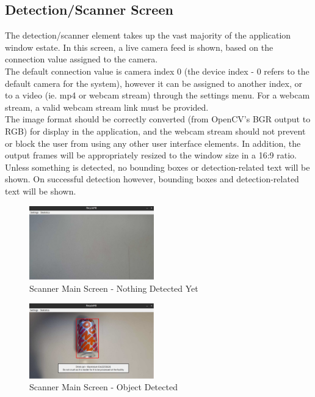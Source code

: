 \documentclass[conference]{IEEEtran}
\begin{document}
\newpage
\subsection{Detection/Scanner Screen}
The detection/scanner element takes up the vast majority of the application window estate. In this screen, a live camera feed is shown, based on the connection value assigned to the camera.~\\

The default connection value is camera index 0 (the device index - 0 refers to the default camera for the system), however it can be assigned to another index, or to a video (ie. mp4 or webcam stream) through the settings menu. For a webcam stream, a valid webcam stream link must be provided.~\\

The image format should be correctly converted (from OpenCV's BGR output to RGB) for display in the application, and the webcam stream should not prevent or block the user from using any other user interface elements. In addition, the output frames will be appropriately resized to the window size in a 16:9 ratio.~\\

Unless something is detected, no bounding boxes or detection-related text will be shown. On successful detection however, bounding boxes and detection-related text will be shown.

\begin{figure}[!h]
    \centering
    \includegraphics[width=0.48\textwidth]{images/nothing_detected.eps}
    \caption{Scanner Main Screen - Nothing Detected Yet}
\end{figure}

\begin{figure}[!h]
    \centering
    \includegraphics[width=0.48\textwidth]{images/successful_detection.eps}
    \caption{Scanner Main Screen - Object Detected}
\end{figure}~\\
\end{document}
